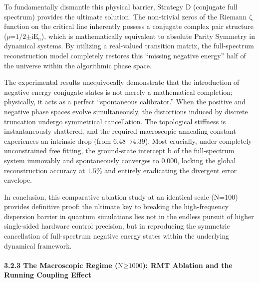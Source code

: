 To fundamentally dismantle this physical barrier, Strategy D (conjugate
full spectrum) provides the ultimate solution. The non-trivial zeros of
the Riemann \(\text{ζ}\) function on the critical line inherently
possess a conjugate complex pair structure
(\(\text{ρ}\text{=1/2±}\text{i}\text{E}_{\text{n}}\)), which is
mathematically equivalent to absolute Parity Symmetry in dynamical
systems. By utilizing a real-valued transition matrix, the full-spectrum
reconstruction model completely restores this ``missing negative
energy'' half of the universe within the algorithmic phase space.

The experimental results unequivocally demonstrate that the introduction
of negative energy conjugate states is not merely a mathematical
completion; physically, it acts as a perfect ``spontaneous calibrator.''
When the positive and negative phase spaces evolve simultaneously, the
distortions induced by discrete truncation undergo symmetrical
cancellation. The topological stiffness is instantaneously shattered,
and the required macroscopic annealing constant experiences an intrinsic
drop (from \(\text{6.48→4.39}\)). Most crucially, under completely
unconstrained free fitting, the ground-state intercept \(\text{b}\) of
the full-spectrum system immovably and spontaneously converges to
\(\text{0.000}\), locking the global reconstruction accuracy at
\(\text{1.5\%}\) and entirely eradicating the divergent error envelope.

In conclusion, this comparative ablation study at an identical scale
(\(\text{N}\text{=100}\)) provides definitive proof: the ultimate key to
breaking the high-frequency dispersion barrier in quantum simulations
lies not in the endless pursuit of higher single-sided hardware control
precision, but in reproducing the symmetric cancellation of
full-spectrum negative energy states within the underlying dynamical
framework.

\hypertarget{the-macroscopic-regime-textntext1000-rmt-ablation-and-the-running-coupling-effect}{%
\paragraph{\texorpdfstring{3.2.3 The Macroscopic Regime
(\(\text{N}\text{≥1000}\)): RMT Ablation and the Running Coupling
Effect}{3.2.3 The Macroscopic Regime (\textbackslash text\{N\}\textbackslash text\{≥1000\}): RMT Ablation and the Running Coupling Effect}}\label{the-macroscopic-regime-textntext1000-rmt-ablation-and-the-running-coupling-effect}}

